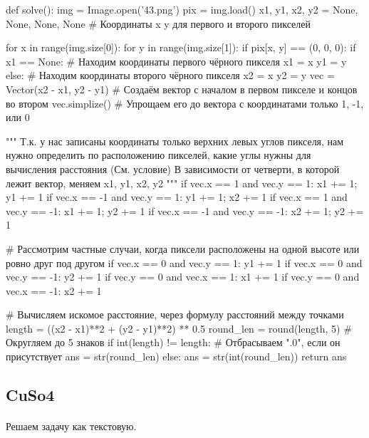 \documentclass[12pt]{article}
\begin{document}
    \begin{pythoncode}
def solve():
    img = Image.open('43.png')
    pix = img.load()
    x1, y1, x2, y2 = None, None, None, None  # Координаты x y для первого и второго пикселей

    for x in range(img.size[0]):
        for y in range(img.size[1]):
            if pix[x, y] == (0, 0, 0):
                if x1 == None:      # Находим координаты первого чёрного пикселя
                    x1 = x
                    y1 = y
                else:               # Находим координаты второго чёрного пикселя
                    x2 = x
                    y2 = y
    vec = Vector(x2 - x1, y2 - y1)  # Создаём вектор с началом в первом пикселе и концов во втором
    vec.simplize()                  # Упрощаем его до вектора с координатами только 1, -1, или 0

    """
    Т.к. у нас записаны координаты только верхних левых углов пикселя, нам нужно определить
    по расположению пикселей, какие углы нужны для вычисления расстояния (См. условие)
    В зависимости от четверти, в которой лежит вектор, меняем x1, y1, x2, y2
    """
    if vec.x == 1 and vec.y == 1: x1 += 1; y1 += 1
    if vec.x == -1 and vec.y == 1: y1 += 1; x2 += 1
    if vec.x == 1 and vec.y == -1: x1 += 1; y2 += 1
    if vec.x == -1 and vec.y == -1: x2 += 1; y2 += 1

    # Рассмотрим частные случаи, когда пиксели расположены на одной высоте или ровно друг под другом
    if vec.x == 0 and vec.y == 1: y1 += 1
    if vec.x == 0 and vec.y == -1: y2 += 1
    if vec.y == 0 and vec.x == 1: x1 += 1
    if vec.y == 0 and vec.x == -1: x2 += 1

    # Вычисляем искомое расстояние, через формулу расстояний между точками
    length = ((x2 - x1)**2 + (y2 - y1)**2) ** 0.5
    round_len = round(length, 5)    # Округляем до 5 знаков
    if int(length) != length:       # Отбрасываем ".0", если он присутствует
        ans = str(round_len)
    else:
        ans = str(int(round_len))
    return ans
    \end{pythoncode}

    \subsection{CuSo4}
    \paragraph{}
    Решаем задачу как текстовую.
\end{document}
